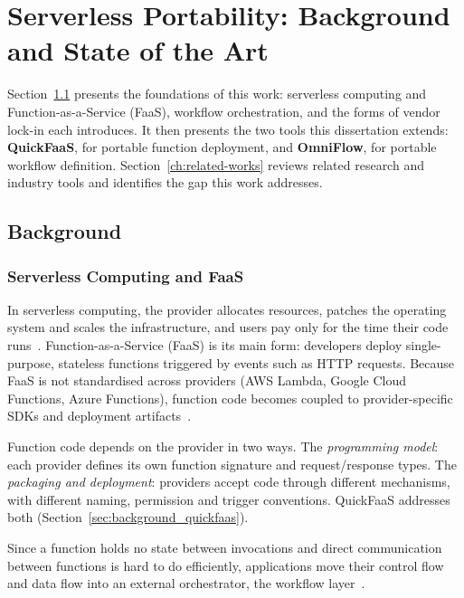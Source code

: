 \chapter{Serverless Portability: Background and State of the Art}
\label{cha:background}

Section~\ref{sec:background} presents the foundations of this work: serverless computing and
Function-as-a-Service (FaaS), workflow orchestration, and the forms of vendor lock-in each
introduces. It then presents the two tools this dissertation extends: \textbf{QuickFaaS}, for
portable function deployment, and \textbf{OmniFlow}, for portable workflow definition.
Section~\ref{ch:related-works} reviews related research and industry tools and identifies the gap
this work addresses.

\section{Background}
\label{sec:background}

\subsection{Serverless Computing and FaaS}
\label{sec:serverless_computing_faas}
In serverless computing, the provider allocates resources, patches the operating system and
scales the infrastructure, and users pay only for the time their code
runs~\cite{serverlessComputing,jonas2019cloudProgramming}. Function-as-a-Service (FaaS) is its main form: developers deploy
single-purpose, stateless functions triggered by events such as HTTP requests. Because FaaS is not
standardised across providers (AWS Lambda, Google Cloud Functions, Azure Functions), function code
becomes coupled to provider-specific SDKs and deployment artifacts~\cite{rodrigues2022quickfaas}.

Function code depends on the provider in two ways. The \emph{programming model}: each provider
defines its own function signature and request/response types. The \emph{packaging and
deployment}: providers accept code through different mechanisms, with different naming, permission
and trigger conventions. QuickFaaS addresses both (Section~\ref{sec:background_quickfaas}).

Since a function holds no state between invocations and direct communication between functions is
hard to do efficiently, applications move their control flow and data flow into an external
orchestrator, the workflow layer~\cite{serverlessComputing}.

